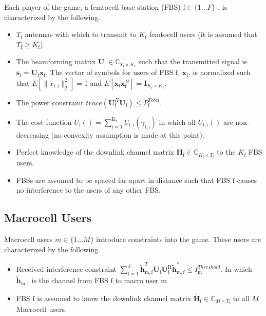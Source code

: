 \documentclass[12pt,a4paper]{report}
\begin{document}
Each player of the game, a femtocell base station (FBS) $\text{f} \in \{1 ... F\}$ , is characterized by the following.
\begin{itemize}
\item 
$T_{\text{f}}$ antennas with which to transmit to $K_{\text{f}}$ femtocell users (it is assumed that $T_{\text{f}} \geq K_{\text{f}}$).
\\
\item 
	The beamforming matrix $\mathbf{U}_{\mathrm{f}} \in \mathbb{C}_{T_{\text{f}} \times K_{\text{f}}}$ such that the transmitted 		
	signal is $\mathbf{s}_{\mathrm{f}
	}= \mathbf{U_{\mathrm{f}}}\mathbf{x_{\mathrm{f}}}$. The 		
	vector of symbols for users of FBS $\text{f}$, $\mathbf{x_{\mathrm{f}}}$, is  normalized such that $E[\|x_{\mathrm{f,i}}
	\|_2^2]=1$ and $E[\mathbf{x}_{\mathrm{f}}\mathbf{x}_{\mathrm{f}}^H]=\mathbf{I}_{K_{\text{f}} \times K_{\text{f}}}$.
\\
\item 
	The power constraint $trace(\mathbf{U}_{\text{f}}^H\mathbf{U}_{\text{f}}) \leq P^{Total}_{\text{f}} $.

\item 
	The cost function $U_{\text{f}}() =
	\sum_{\mathrm{i=1}}^{\mathrm{K_{\text{f}}}}
    	 U_{\mathrm{f,i}}(\gamma_{\mathrm{f,i}}) $
    	in which all $U_{\mathrm{f,i}}()$ are non-decreasing (no convexity assumption is made at this point).

\item 
	Perfect knowledge of the downlink channel matrix $\mathbf{H_\mathrm{f}} \in \mathbb{C}_{K_{\text{f}} \times T_{\text{f}}} $ to the $K_{\text{f}}$ FBS users.
\\
\item
	 FBSs are assumed to be spaced far apart in distance such that FBS $\text{f}$ 
	 causes no interference to the users of any other FBS.
\end{itemize}

\subsection{Macrocell Users}
Macrocell users $m \in \{1 ... M\}$ introduce constraints into the game. These users are characterized by the following.

\begin{itemize}
\item 
	Received interference constraint
	$\sum^F_{\text{f}=1} \mathbf{\tilde{h}}_{\mathrm{m,f}}^T  \mathbf{U_{\mathrm{f}}} 						
	\mathbf{U_{\mathrm{f}}^{\mathrm{H}}} \mathbf{\tilde{h}_{\mathrm{m,f}}^*} \leq I^{Threshold}		
	_{\mathrm{m}} $. In which $\mathbf{\tilde{h}}_{\mathrm{m,f}}$ is the channel from FBS $\text{f}$ to macro user $\text{m}$

\item 
	FBS $\text{f}$ is assumed to know the downlink channel matrix $\tilde{\mathbf{H}_{\mathrm{f}}} \in \mathbb{C}_{M \times T_{\text{f}}}$ to all $M$ Macrocell users.
\\
\end{itemize}
\end{document}
